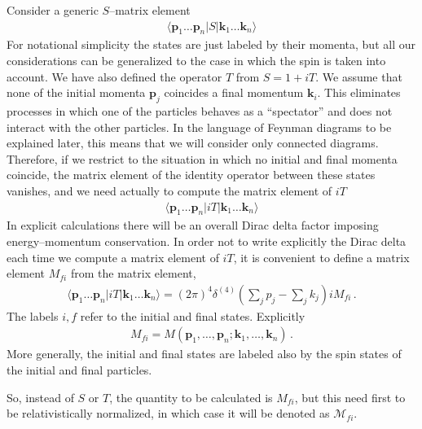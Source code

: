 Consider a generic $S$--matrix element
\begin{align}
\langle\mathbf{p}_1\ldots\mathbf{p}_n|S|\mathbf{k}_1\ldots\mathbf{k}_n\rangle
\end{align}
For notational simplicity the states are just labeled by their momenta, but all our considerations can be generalized to the case in which the spin is taken into account. We have also defined the operator $T$ from $S=1+i T$. We assume that none of the initial momenta $\mathbf{p}_j$ coincides a final momentum $\mathbf{k}_i$. This eliminates processes in which one of the particles behaves as a ``spectator'' and does not interact with the other particles. In the language of Feynman diagrams to be explained later, this means that we will consider only connected diagrams. Therefore, if we restrict to the situation in which no initial and final momenta coincide, the matrix element of the identity operator between these states vanishes, and we need  actually to compute the matrix element of $i T$
\begin{align}
\langle\mathbf{p}_1\ldots\mathbf{p}_n|i T|\mathbf{k}_1\ldots\mathbf{k}_n\rangle
\end{align}
In explicit calculations there will be an overall  Dirac delta factor imposing energy--momentum conservation. In order not to write explicitly the Dirac delta each time we compute a matrix element of $i T$, it is convenient to define a matrix element $M_{fi}$ from 
the matrix element,
\begin{align}
  \label{eq:41}
  \langle\mathbf{p}_1\ldots\mathbf{p}_n|i T|\mathbf{k}_1\ldots\mathbf{k}_n\rangle
=(2\pi)^4\delta^{(4)}\left(\sum_j p_j-\sum_j k_j\right)i {M}_{fi}\,.
\end{align}
The labels $i,f$ refer to the initial and final states. Explicitly
\begin{align}
  M_{fi}=M(\mathbf{p}_1,\ldots,\mathbf{p}_n;\mathbf{k}_1,\ldots,\mathbf{k}_n)\,.
\end{align}
More generally, the initial and final states are labeled also by the spin states of the initial and final particles.

So, instead of $S$ or $T$, the quantity to be calculated is $M_{fi}$, but this need first to be relativistically normalized, in which case it will be denoted as $\mathcal{M}_{fi}$.



%
